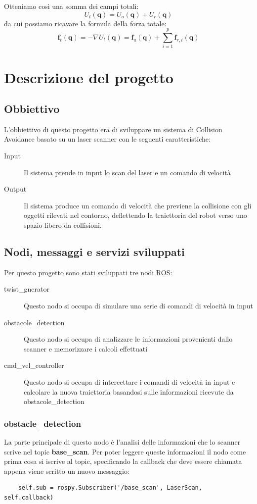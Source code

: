 \documentclass[Lau, binding=0.6cm, oneside]{sapthesis}
\begin{document}
Otteniamo così una somma dei campi totali:
$$
U_{t}(\boldsymbol{q})=U_{a}(\boldsymbol{q})+U_{r}(\boldsymbol{q})
$$
da cui possiamo ricavare la formula della forza totale:
$$
\boldsymbol{f}_{t}(\boldsymbol{q})=-\nabla U_{t}(\boldsymbol{q})=\boldsymbol{f}_{a}(\boldsymbol{q})+\sum_{i=1}^{p} \boldsymbol{f}_{r, i}(\boldsymbol{q})
$$

\chapter{Descrizione del progetto}
\section{Obbiettivo}
L'obbiettivo di questo progetto era di sviluppare un sistema di Collision Avoidance basato su un laser scanner con le seguenti caratteristiche:
\begin{description}
	\item[Input] Il sistema prende in input lo scan del laser e un comando di velocità
	\item[Output] Il sistema produce un comando di velocità che previene la collisione con gli oggetti rilevati nel contorno, deflettendo la traiettoria del robot verso uno spazio libero da collisioni.
\end{description}

\section{Nodi, messaggi e servizi sviluppati}
Per questo progetto sono stati sviluppati tre nodi ROS:
\begin{description}
	\item[twist\_gnerator] Questo nodo si occupa di simulare una serie di comandi di velocità in input
	\item[obstacole\_detection] Questo nodo si occupa di analizzare le informazioni provenienti dallo scanner e memorizzare i calcoli effettuati
	\item[cmd\_vel\_controller] Questo nodo si occupa di intercettare i comandi di velocità in input e calcolare la nuova traiettoria basandosi sulle informazioni ricevute da obstacole\_detection
\end{description}

\subsection{obstacle\_detection}
La parte principale di questo nodo è l'analisi delle informazioni che lo scanner scrive nel topic \textbf{base\_scan}.
Per poter leggere queste informazioni il nodo come prima cosa si iscrive al topic, specificando la callback che deve essere chiamata appena viene scritto un nuovo messaggio:

\begin{lstlisting}
	self.sub = rospy.Subscriber('/base_scan', LaserScan, self.callback)
\end{lstlisting}



\end{document}
